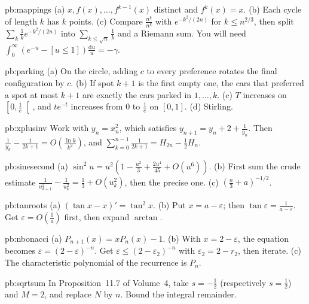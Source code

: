 \begin{hint}{pb:mappings}
(a) $x,f(x),\dots,f^{k-1}(x)$ distinct and $f^k(x)=x$. (b) Each cycle of length $k$ has $k$ points. (c) Compare $\frac{n^{\underline k}}{n^k}$ with $e^{-k^2/(2n)}$ for $k\le n^{2/3}$, then split
$\sum_k\frac1ke^{-k^2/(2n)}$ into $\sum_{k\le\sqrt n}\frac1k$ and a Riemann sum. You will need $\int_0^\infty(e^{-u}-[u\le1])\frac{\mathrm du}u=-\gamma$.
\end{hint}

\begin{hint}{pb:parking}
(a) On the circle, adding $c$ to every preference rotates the final configuration by $c$. (b) If spot $k+1$ is the first empty one, the cars that preferred a spot at most $k+1$
are exactly the cars parked in $1,\dots,k$. (c) $T$ increases on $\left[0,\frac1e\right[$, and $te^{-t}$ increases from $0$ to $\frac1e$ on $[0,1]$. (d) Stirling.
\end{hint}

\begin{hint}{pb:xplusinv}
Work with $y_n=x_n^2$, which satisfies $y_{n+1}=y_n+2+\frac1{y_n}$. Then $\frac1{y_k}-\frac1{2k+1}=O(\frac{\ln k}{k^2})$, and $\sum_{k=0}^{n-1}\frac1{2k+1}=H_{2n}-\frac12H_n$.
\end{hint}

\begin{hint}{pb:sinesecond}
(a) $\sin^2u=u^2(1-\frac{u^2}3+\frac{2u^4}{45}+O(u^6))$. (b) First sum the crude estimate $\frac1{u_{k+1}^2}-\frac1{u_k^2}=\frac13+O(u_k^2)$, then the precise one. (c) $(\frac n3+a)^{-1/2}$.
\end{hint}

\begin{hint}{pb:tanroots}
(a) $(\tan x-x)'=\tan^2x$. (b) Put $x=a-\varepsilon$; then $\tan\varepsilon=\frac1{a-\varepsilon}$. Get $\varepsilon=O(\frac1a)$ first, then expand $\arctan$.
\end{hint}

\begin{hint}{pb:nbonacci}
(a) $P_{n+1}(x)=xP_n(x)-1$. (b) With $x=2-\varepsilon$, the equation becomes $\varepsilon=(2-\varepsilon)^{-n}$. Get $\varepsilon\le(2-\varepsilon_2)^{-n}$ with $\varepsilon_2=2-r_2$, then iterate.
(c) The characteristic polynomial of the recurrence is $P_n$.
\end{hint}

\begin{hint}{pb:sqrtsum}
In Proposition~11.7 of Volume~4, take $s=-\frac12$ (respectively $s=\frac12$) and $M=2$, and replace $N$ by $n$. Bound the integral remainder.
\end{hint}

